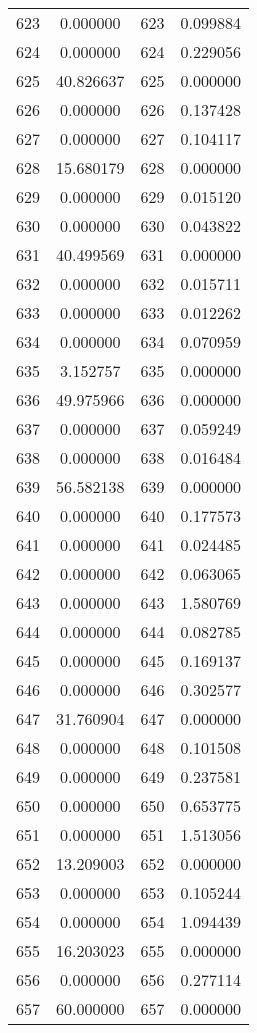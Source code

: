 \documentclass[12pt]{article}
\begin{document}
\begin{longtable}{@{}cccc@{}}
623 & 0.000000 & 623 & 0.099884 \\
624 & 0.000000 & 624 & 0.229056 \\
625 & 40.826637 & 625 & 0.000000 \\
626 & 0.000000 & 626 & 0.137428 \\
627 & 0.000000 & 627 & 0.104117 \\
628 & 15.680179 & 628 & 0.000000 \\
629 & 0.000000 & 629 & 0.015120 \\
630 & 0.000000 & 630 & 0.043822 \\
631 & 40.499569 & 631 & 0.000000 \\
632 & 0.000000 & 632 & 0.015711 \\
633 & 0.000000 & 633 & 0.012262 \\
634 & 0.000000 & 634 & 0.070959 \\
635 & 3.152757 & 635 & 0.000000 \\
636 & 49.975966 & 636 & 0.000000 \\
637 & 0.000000 & 637 & 0.059249 \\
638 & 0.000000 & 638 & 0.016484 \\
639 & 56.582138 & 639 & 0.000000 \\
640 & 0.000000 & 640 & 0.177573 \\
641 & 0.000000 & 641 & 0.024485 \\
642 & 0.000000 & 642 & 0.063065 \\
643 & 0.000000 & 643 & 1.580769 \\
644 & 0.000000 & 644 & 0.082785 \\
645 & 0.000000 & 645 & 0.169137 \\
646 & 0.000000 & 646 & 0.302577 \\
647 & 31.760904 & 647 & 0.000000 \\
648 & 0.000000 & 648 & 0.101508 \\
649 & 0.000000 & 649 & 0.237581 \\
650 & 0.000000 & 650 & 0.653775 \\
651 & 0.000000 & 651 & 1.513056 \\
652 & 13.209003 & 652 & 0.000000 \\
653 & 0.000000 & 653 & 0.105244 \\
654 & 0.000000 & 654 & 1.094439 \\
655 & 16.203023 & 655 & 0.000000 \\
656 & 0.000000 & 656 & 0.277114 \\
657 & 60.000000 & 657 & 0.000000 \\

\end{longtable}
\end{document}
